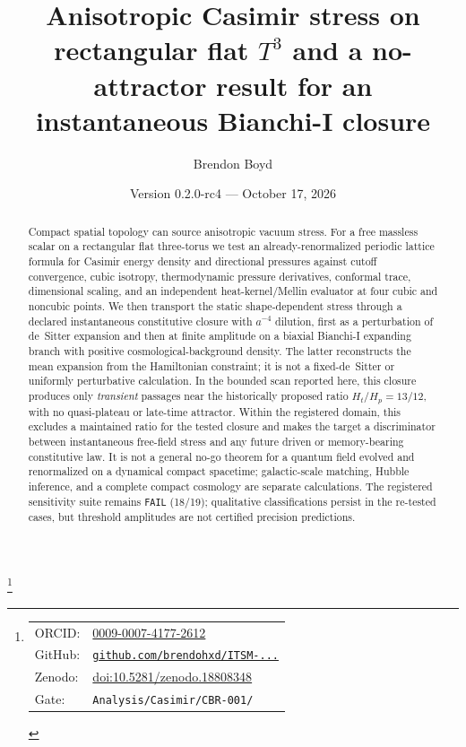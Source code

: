 \documentclass[aps,prd,reprint,superscriptaddress,nofootinbib,floatfix,showkeys]{revtex4-2}
\newcommand{\Tthree}{T^{3}}
\newcommand{\Ht}{H_{t}}
\newcommand{\Hp}{H_{p}}
\begin{document}
\title{Anisotropic Casimir stress on rectangular flat
\texorpdfstring{\(\Tthree\)}{T3} and a no-attractor result for an
instantaneous Bianchi-I closure}

\author{Brendon Boyd}
\thanks{%
\begin{tabular}{@{}l@{\ }l@{}}
ORCID: & \href{https://orcid.org/0009-0007-4177-2612}{0009-0007-4177-2612} \\
GitHub: & \href{https://github.com/brendohxd/ITSM-Integrated-Toroidal-Syntropic-Model}{\texttt{github.com/brendohxd/ITSM-...}} \\
Zenodo: & \href{https://doi.org/10.5281/zenodo.18808348}{doi:10.5281/zenodo.18808348} \\
Gate: & \texttt{Analysis/Casimir/CBR-001/} \\
\end{tabular}%
}

\date{Version 0.2.0-rc4 --- October 17, 2026}

\begin{abstract}
Compact spatial topology can source anisotropic vacuum stress.
For a free massless scalar on a rectangular flat three-torus we test an
already-renormalized periodic lattice formula for Casimir energy density and
directional pressures against cutoff convergence, cubic isotropy,
thermodynamic pressure derivatives, conformal trace, dimensional scaling, and
an independent heat-kernel/Mellin evaluator at four cubic and noncubic points.
We then transport the static shape-dependent stress through a declared
instantaneous constitutive closure with \(a^{-4}\) dilution, first as a
perturbation of de~Sitter expansion and then at finite amplitude on a biaxial
Bianchi-I expanding branch with positive cosmological-background density.
The latter reconstructs the mean expansion from the Hamiltonian constraint;
it is not a fixed-de~Sitter or uniformly perturbative calculation.
In the bounded scan reported here,
this closure produces only \emph{transient} passages near the historically
proposed ratio \(\Ht/\Hp=13/12\), with no quasi-plateau or late-time
attractor.  Within the registered domain, this excludes a maintained ratio
for the tested closure and makes the target a discriminator between
instantaneous free-field stress and any future driven or memory-bearing
constitutive law.  It is not a general no-go theorem for a quantum field
evolved and renormalized on a dynamical compact spacetime; galactic-scale
matching, Hubble inference, and a complete compact cosmology are separate
calculations. The registered sensitivity suite remains \texttt{FAIL}
(18/19); qualitative classifications persist in the re-tested cases, but
threshold amplitudes are not certified precision predictions.
\end{abstract}
\end{document}
